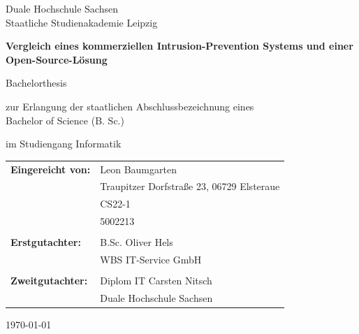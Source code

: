 \documentclass[12pt]{scrreprt}
\begin{document}
	
	\begin{titlepage}
		\centering
		
		
		\large
		Duale Hochschule Sachsen \\
		Staatliche Studienakademie Leipzig
		
		\vspace{2cm} 
		
		{\huge\bfseries Vergleich eines kommerziellen Intrusion-Prevention Systems und einer Open-Source-Lösung\par}
		
		\vspace{1.5cm} %
		

		{\Large Bachelorthesis\par}
		
		\vspace{0.5cm}
		

		zur Erlangung der staatlichen Abschlussbezeichnung eines \\
		Bachelor of Science (B. Sc.)
		
		\vspace{0.5cm} 
		
		im Studiengang Informatik
		
		\vfill 
		
		\begin{flushleft}
			\begin{tabular}{@{}ll}
				\textbf{Eingereicht von:} & Leon Baumgarten\\
				& Traupitzer Dorfstraße 23, 06729 Elsteraue \\
				& CS22-1 \\
				& 5002213 \\
				\\ 
				\textbf{Erstgutachter:} & B.Sc. Oliver Hels \\
				& WBS IT-Service GmbH\\
				\\ 
				\textbf{Zweitgutachter:} & Diplom IT Carsten Nitsch \\
				& Duale Hochschule Sachsen
			\end{tabular}
			
			\vspace{2cm}
			
{\today\par}
			
		\end{flushleft}
		
	\end{titlepage}
	
\end{document}
